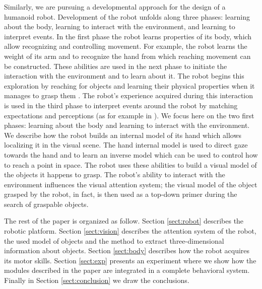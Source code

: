 Similarly, we are pursuing a developmental approach for the design of a humanoid robot. Development of the robot unfolds along three phases: learning about the body, learning to interact with the environment, and learning to interpret events. In the first phase the robot learns properties of its body, which allow recognizing and controlling movement. For example, the robot learns the weight of its arm and to recognize the hand from which reaching movement can be constructed. These abilities are used in the next phase to initiate the interaction with the environment and to learn about it. The robot begins this exploration by reaching for objects and learning their physical properties when it manages to grasp them \cite{natale04learning,natale05exploring,torres-jara05tapping}. The robot's experience acquired during this interaction is used in the third phase to interpret events around the robot by matching expectations and perceptions (as for example in \cite{metta03early}). We focus here on the two first phases: learning about the body and learning to interact with the environment. We describe how the robot builds an internal model of its hand which allows localizing it in the visual scene. The hand internal model is used to direct gaze towards the hand and to learn an inverse model which can be used to control how to reach a point in space. The robot uses these abilities to build a visual model of the objects it happens to grasp. The robot's ability to interact with the environment influences the visual attention system; the visual model of the object grasped by the robot, in fact, is then used as a top-down primer during the search of graspable objects.

The rest of the paper is organized as follow. Section \ref{sect:robot} describes the robotic platform. Section \ref{sect:vision} describes the attention system of the robot, the used model of objects and the method to extract three-dimensional information about objects. Section \ref{sect:body} describes how the robot acquires its motor skills. Section \ref{sect:exp} presents an experiment where we show how the modules described in the paper are integrated in a complete behavioral system. Finally in Section \ref{sect:conclusion} we draw the conclusions.
